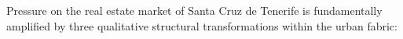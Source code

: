


Pressure on the real estate market of Santa Cruz de Tenerife is fundamentally amplified by three qualitative structural transformations within the urban fabric:

